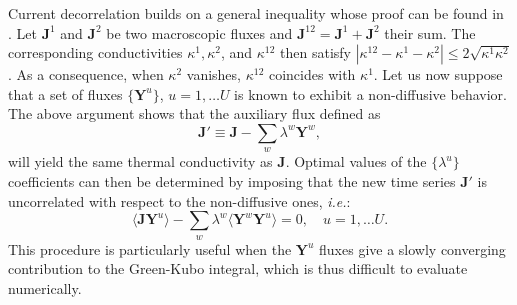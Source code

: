 Current decorrelation builds on a general inequality whose proof can be found in \cite{Marcolongo2016}.  Let $\mathbf{J}^1$ and $\mathbf{J}^2$ be two macroscopic fluxes and $\mathbf{J}^{12}=\mathbf{J}^1+\mathbf{J}^2$ their sum. The corresponding conductivities $\kappa^1, \kappa^2$, and $\kappa^{12}$ then satisfy $|\kappa^{12}-\kappa^1-\kappa^2| \le 2 \sqrt{\kappa^1 \kappa^2}$. As a consequence, when $\kappa^2$ vanishes, $\kappa^{12}$ coincides with $\kappa^1$. Let us now suppose that a set of fluxes $\lbrace\mathbf{Y}^u\rbrace$, $u=1,\dots U$ is known to exhibit a non-diffusive behavior. The above argument shows that the auxiliary flux defined as
\begin{equation}
 \mathbf{J}' \equiv \mathbf{J} - \sum_w \lambda^w \mathbf{Y}^w,
\end{equation}
will yield the same thermal conductivity as $\mathbf{J}$.
Optimal values of the $\lbrace\lambda^u\rbrace$ coefficients can then be determined by imposing that the new time series $\mathbf{J}'$ is uncorrelated with respect to the non-diffusive ones, \emph{i.e.}:
\begin{equation}
\langle \mathbf{J} \mathbf{Y}^u \rangle-\sum_{w} \lambda^{w} \langle \mathbf{Y}^{w} \mathbf{Y}^u \rangle = 0, \quad u=1,\dots U.
\end{equation}
This procedure is particularly useful when the $\mathbf{Y}^u$ fluxes give a slowly converging contribution to the Green-Kubo integral, which is thus difficult to evaluate numerically.

